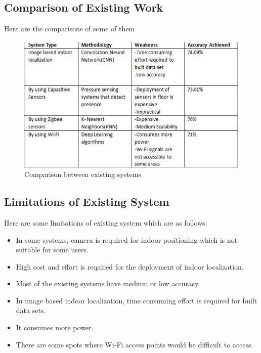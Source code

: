 \subsection{Comparison of Existing Work}
Here are the comparisons of some of them
\begin{figure}[h]
  		\centering
    		\includegraphics[scale=0.9]{./Figures/comparison}
\caption{Comparison between existing systems}
\label{fig:7}
 		\end{figure}

\subsection{Limitations of Existing System}
Here are some limitations of existing system which are as follows:
\begin{itemize}
\item In some systems, camera is required for indoor positioning which is not suitable for some users.
\item High cost and effort is required for the deployment of indoor localization.
\item Most of the existing systems have medium or low accuracy.
\item In image based indoor localization, time consuming effort is required for built data sets. 
\item It consumes more power.
\item There are some spots where Wi-Fi access points would be difficult to access.
\\\\
\end{itemize}

